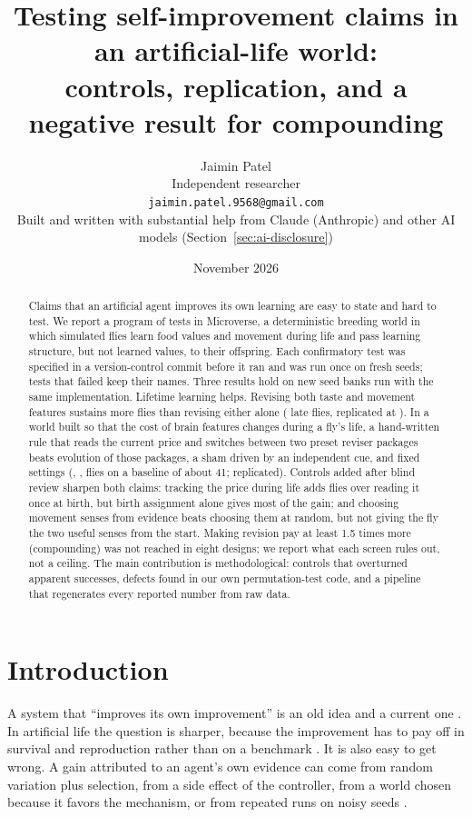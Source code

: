 \documentclass[11pt]{article}
\title{Testing self-improvement claims in an artificial-life world:\\
controls, replication, and a negative result for compounding}
\author{Jaimin Patel\\
\small Independent researcher\\
\small\texttt{jaimin.patel.9568@gmail.com}\\
\small Built and written with substantial help from Claude (Anthropic) and other AI models (Section~\ref{sec:ai-disclosure})}
\date{November 2026}
\begin{document}
\maketitle

\begin{abstract}
Claims that an artificial agent improves its own learning are easy to state and hard to test. We report a program of tests in Microverse, a deterministic breeding world in which simulated flies learn food values and movement during life and pass learning structure, but not learned values, to their offspring. Each confirmatory test was specified in a version-control commit before it ran and was run once on fresh seeds; tests that failed keep their names. Three results hold on new seed banks run with the same implementation. Lifetime learning helps. Revising both taste and movement features sustains more flies than revising either alone (\GsevenCTasteMean{} late flies, replicated at \RepGsevenCTasteMean). In a world built so that the cost of brain features changes during a fly's life, a hand-written rule that reads the current price and switches between two preset reviser packages beats evolution of those packages, a sham driven by an independent cue, and fixed settings (\LtwoEvorMean, \LtwoShamMean, \LtwoFixedMean{} flies on a baseline of about 41; replicated). Controls added after blind review sharpen both claims: tracking the price during life adds \EoneBirthMean{} flies over reading it once at birth, but birth assignment alone gives most of the gain; and choosing movement senses from evidence beats choosing them at random, but not giving the fly the two useful senses from the start.
Making revision pay at least 1.5 times more (compounding) was not reached in eight designs; we report what each screen rules out, not a ceiling. The main contribution is methodological: controls that overturned apparent successes, defects found in our own permutation-test code, and a pipeline that regenerates every reported number from raw data.
\end{abstract}

\section{Introduction}
\label{sec:intro}

A system that ``improves its own improvement'' is an old idea \citep{schmidhuber2007godel,schmidhuber2013powerplay} and a current one \citep{zhang2025darwin}. In artificial life the question is sharper, because the improvement has to pay off in survival and reproduction rather than on a benchmark \citep{ofria2004avida,yaeger1994polyworld}. It is also easy to get wrong. A gain attributed to an agent's own evidence can come from random variation plus selection, from a side effect of the controller, from a world chosen because it favors the mechanism, or from repeated runs on noisy seeds \citep{gelman2014statistical}.
\end{document}
